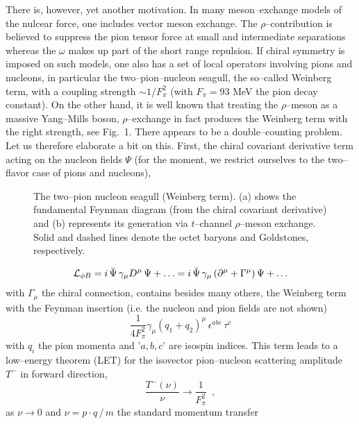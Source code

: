 There is, however, yet another motivation. In many meson--exchange
models of the nulcear force, one includes vector meson exchange. The
$\rho$--contribution is believed to suppress the pion tensor force at
small and intermediate separations whereas the $\omega$ makes up part
of the short range repulsion. If chiral symmetry is imposed on such
models, one also has a set of local operators involving pions and
nucleons, in particular the two--pion--nucleon seagull, the so--called
Weinberg term, with a coupling strength $\sim 1/F_\pi^2$ (with $F_\pi =
93$ MeV the pion decay constant). On the other hand, it is well known
that treating the $\rho$--meson as a massive Yang--Mills boson,
$\rho$--exchange in fact produces the Weinberg term with the right
strength, see Fig.~1. There appears to be a double--counting
problem. Let us therefore elaborate a bit on this. First, the chiral
covariant derivative term acting on the nucleon fields $\Psi$ (for the
moment, we restrict ourselves to the two--flavor case of pions and nucleons),
\begin{figure}[t]
\hskip 1.2in
\epsfysize=1.5in
\caption{\label{fig1} The two--pion nucleon seagull (Weinberg
term). (a) shows the fundamental Feynman diagram (from the chiral
covariant derivative) and  (b) represents its generation via
$t$--channel $\rho$--meson exchange. Solid and dashed
lines denote the octet baryons and Goldstones, respectively.}
\end{figure}
\begin{equation}
{\cal L}_{\phi B} = i \, \bar{\Psi} \, \gamma_\mu D^\mu \, \Psi + \ldots =
i \, \bar{\Psi} \, \gamma_\mu \, (\partial^\mu + \Gamma^\mu ) \, \Psi + \ldots
\label{chicov}
\end{equation}
with $\Gamma_\mu$ the chiral connection, contains besides many others,
the Weinberg term with the Feynman insertion (i.e. the nucleon and pion
fields are not shown)
\begin{equation}
\frac{1}{4 F_\pi^2} \gamma_\mu (q_1 + q_2)^\mu \, \epsilon^{abc}
\, \tau^c
\label{weinterm}
\end{equation}
with $q_i$ the pion momenta and '$a,b,c$' are isospin indices. This
term leads to a low--energy theorem (LET) for the isovector
pion--nucleon scattering  amplitude $T^-$ in forward direction,
\begin{equation}
\frac{T^-(\nu )}{ \nu } \to \frac{1}{F_\pi^2} \, \, \, ,
\label{let}
\end{equation}
as $\nu \to 0$ and $\nu = p \cdot q \, / \, m$ the standard momentum transfer
